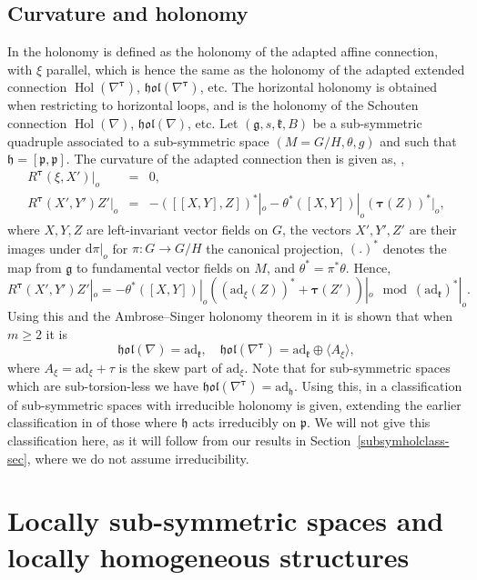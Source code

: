\documentclass{amsart}
\theoremstyle{plain}
\theoremstyle{definition}
\newcommand{\Hol}{\operatorname{Hol}}
\newcommand{\h}{\mathfrak{h}}
\newcommand{\hol}{\mathfrak{hol}}
\newcommand{\bt}{{\boldsymbol{\tau}}}
\newcommand{\1}{\mathbf{1}}
\newcommand{\ad}{\mathrm{ad}}
\newcommand{\p}{\mathfrak{p}}
\renewcommand{\k}{\mathfrak{k}}
\newcommand{\g}{\mathfrak{g}}
\renewcommand{\d}{\mathrm{d}}
\newcommand{\+}{\oplus}
\newcommand{\acom}[1]{
 \marginpar{{\scriptsize A: #1 }}}
\begin{document}
\subsection{Curvature and holonomy}
In \cite{FGR} the  holonomy is defined as the holonomy of the  adapted affine connection, with $\xi$ parallel, which is hence the same as the holonomy of the adapted extended connection $\Hol(\nabla^\bt)$, $\hol(\nabla^\bt)$,  etc. The horizontal holonomy is obtained when restricting to horizontal loops, and  is the holonomy of the Schouten connection $\Hol(\nabla)$, $\hol(\nabla)$, etc. Let $(\g,s,\k,B)$ be a sub-symmetric quadruple associated to a sub-symmetric space $(M=G/H,\theta,g)$ and such that $\h=[\p,\p]$. 
The curvature of the adapted connection then is given as,  \cite[Proposition~4.1]{FGR}, 
\begin{eqnarray*}
R^\bt(\xi,X')|_o&=&0,
\\
R^\bt (X',Y')Z'|_o&=&-\left(\left[ \left[ X,Y\right],Z\right]\right)^*|_o -\theta^*([X,Y])|_o(\bt(Z))^*|_o,
\end{eqnarray*}
where $X,Y,Z$ are left-invariant vector fields on $G$, the vectors $X',Y',Z'$ are their images under $\d\pi|_o$ for $\pi:G\to G/H$ the canonical projection, $(.)^*$ denotes the map from $\g$ to fundamental vector fields on $M$, and $\theta^*=\pi^*\theta$.
Hence, 
\[
R^\bt (X',Y')Z'|_o=-\theta^*([X,Y])|_o\left( (\ad_\xi (Z))^* + \bt(Z')\right)|_o\mod (\ad_\k)^*|_o.
\]
Using this  and the Ambrose--Singer holonomy theorem 
 in \cite[Theorem~5.1]{FGR} it is shown that when $m\ge 2$ it is 
\begin{equation}
\label{symhol}
\hol(\nabla)=\ad_\k,\quad \hol(\nabla^\bt)=\ad_\k\+ \langle A_\xi\rangle,\end{equation}
 where 
$A_\xi=\ad_\xi+\tau$ is the skew part of $\ad_\xi$. Note that for sub-symmetric spaces which are sub-torsion-less we have $\hol(\nabla^\bt)=\ad_\h$.   Using this, in \cite[Theorem~6.1]{FGR} a classification of sub-symmetric spaces with irreducible holonomy is given, extending the earlier classification in \cite[Theorem 5.1]{FG} of those where $\h$ acts irreducibly on $\p$.  We will not give this classification here, as it  will follow from our results in Section~\ref{subsymholclass-sec}, where we do not assume irreducibility.





\section{Locally sub-symmetric spaces and locally homogeneous structures}\label{secLocsubsym}
\end{document}
